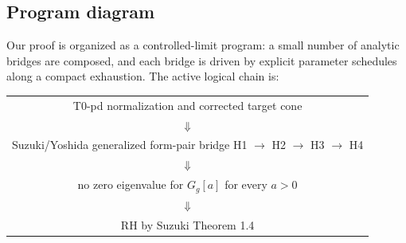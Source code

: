 \subsection*{Program diagram}
Our proof is organized as a controlled-limit program: a small number of analytic bridges are composed, and each bridge is driven by explicit parameter schedules along a compact exhaustion. The active logical chain is:

\begin{center}
  \small
  \begin{tabular}{c}
    \textup{T0-pd} normalization and corrected target cone \\
    $\Downarrow$ \\
    Suzuki/Yoshida generalized form-pair bridge \textup{H1} $\to$ \textup{H2} $\to$ \textup{H3} $\to$ \textup{H4} \\
    $\Downarrow$ \\
    no zero eigenvalue for $G_g[a]$ for every $a>0$ \\
    $\Downarrow$ \\
    RH by Suzuki Theorem 1.4
  \end{tabular}
\end{center}

